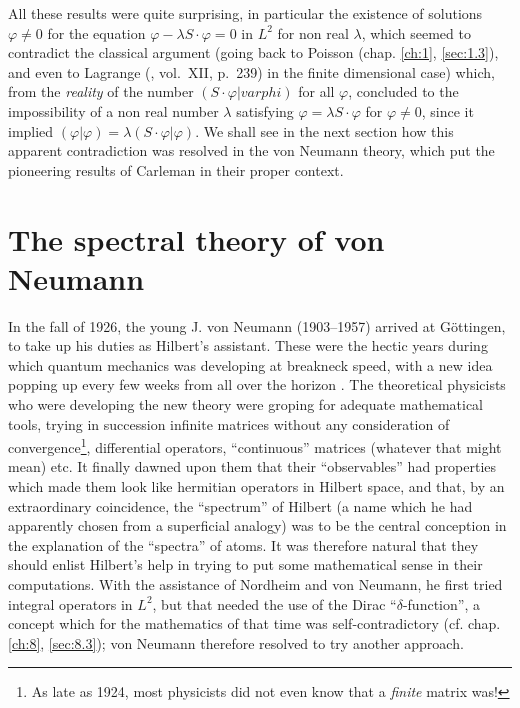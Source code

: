 \documentclass[12pt,a4paper,leqno,twoside]{extbook}
\begin{document}
All these results were quite surprising, in particular the existence of solutions \(\varphi \neq 0\) for the equation \(\varphi - \lambda S \cdot \varphi = 0\) in \(L^2\) for non real \(\lambda\), which seemed to contradict the classical argument (going back to Poisson (chap. \ref{ch:1}, \ref{sec:1.3}), and even to Lagrange (\cite{135}, vol.~XII, p.~239) in the finite dimensional case) which, from the \emph{reality} of the number \((S \cdot \varphi | varphi)\) for all \(\varphi\), concluded to the impossibility of a non real number \(\lambda\) satisfying \(\varphi = \lambda S \cdot \varphi\) for \(\varphi \neq 0\), since it implied \((\varphi | \varphi) = \lambda(S \cdot \varphi | \varphi)\). We shall see in the next section how this apparent contradiction was resolved in the von Neumann theory, which put the pioneering results of Carleman in their proper context.

\section{The spectral theory of von Neumann}
\label{sec:7.4}

In the fall of 1926, the young J. von Neumann (1903--1957) arrived at Göttingen, to take up his duties as Hilbert's assistant. These were the hectic years during which quantum mechanics was developing at breakneck speed, with a new idea popping up every few weeks from all over the horizon \cite{121}. The theoretical physicists who were developing the new theory were groping for adequate mathematical tools, trying in succession infinite matrices without any consideration of convergence\footnote{As late as 1924, most physicists did not even know that a \emph{finite} matrix was!}, differential operators, ``continuous'' matrices (whatever that might mean) etc. It finally dawned upon them that their ``observables'' had properties which made them look like hermitian operators in Hilbert space, and that, by an extraordinary coincidence, the ``spectrum'' of Hilbert (a name which he had apparently chosen from a superficial analogy) was to be the central conception in the explanation of the ``spectra'' of atoms. It was therefore natural that they should enlist Hilbert's help in trying to put some mathematical sense in their computations. With the assistance of Nordheim and von Neumann, he first tried integral operators in \(L^2\), but that needed the use of the Dirac ``\(\delta\)-function'', a concept which for the mathematics of that time was self-contradictory (cf. chap. \ref{ch:8}, \ref{sec:8.3}); von Neumann therefore resolved to try another approach.
\end{document}
